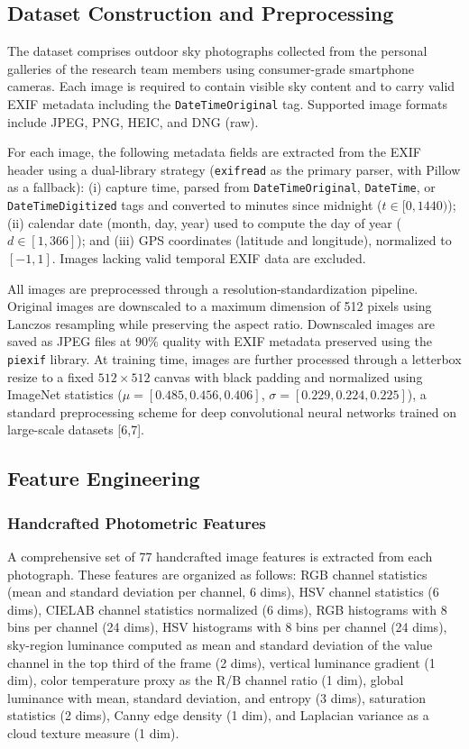 \documentclass[9pt, a4paper, twocolumn]{article}
\begin{document}
\subsection{Dataset Construction and Preprocessing}

The dataset comprises outdoor sky photographs collected from the personal galleries of the research team members using consumer-grade smartphone cameras. Each image is required to contain visible sky content and to carry valid EXIF metadata including the \texttt{DateTimeOriginal} tag. Supported image formats include JPEG, PNG, HEIC, and DNG (raw).

For each image, the following metadata fields are extracted from the EXIF header using a dual-library strategy (\texttt{exifread} as the primary parser, with Pillow as a fallback): (i) capture time, parsed from \texttt{DateTimeOriginal}, \texttt{DateTime}, or \texttt{DateTimeDigitized} tags and converted to minutes since midnight ($t \in [0, 1440)$); (ii) calendar date (month, day, year) used to compute the day of year ($d \in [1, 366]$); and (iii) GPS coordinates (latitude and longitude), normalized to $[-1, 1]$. Images lacking valid temporal EXIF data are excluded.

All images are preprocessed through a resolution-standardization pipeline. Original images are downscaled to a maximum dimension of 512 pixels using Lanczos resampling while preserving the aspect ratio. Downscaled images are saved as JPEG files at 90\% quality with EXIF metadata preserved using the \texttt{piexif} library. At training time, images are further processed through a letterbox resize to a fixed $512 \times 512$ canvas with black padding and normalized using ImageNet statistics ($\mu = [0.485, 0.456, 0.406]$, $\sigma = [0.229, 0.224, 0.225]$), a standard preprocessing scheme for deep convolutional neural networks trained on large-scale datasets [6,7].

\subsection{Feature Engineering}

\subsubsection{Handcrafted Photometric Features}

A comprehensive set of 77 handcrafted image features is extracted from each photograph. These features are organized as follows: RGB channel statistics (mean and standard deviation per channel, 6 dims), HSV channel statistics (6 dims), CIELAB channel statistics normalized (6 dims), RGB histograms with 8 bins per channel (24 dims), HSV histograms with 8 bins per channel (24 dims), sky-region luminance computed as mean and standard deviation of the value channel in the top third of the frame (2 dims), vertical luminance gradient (1 dim), color temperature proxy as the R/B channel ratio (1 dim), global luminance with mean, standard deviation, and entropy (3 dims), saturation statistics (2 dims), Canny edge density (1 dim), and Laplacian variance as a cloud texture measure (1 dim).
\end{document}
